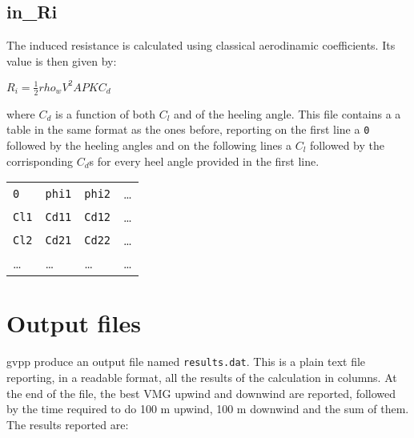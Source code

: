 \documentclass[a4paper,openany]{memoir}
\begin{document}
\section{in\_Ri}

The induced resistance is calculated using classical aerodinamic coefficients. Its value is then given by:

\begin{center} 
  $ R_i = \frac{1}{2} rho_w V^2 APK C_d $ 
\end{center}

where $C_d$ is a function of both $C_l$ and of the heeling angle.
This file contains a a table in the same format as the ones before, reporting on the first line a \texttt{0} followed by the heeling angles and on the following lines a $C_l$ followed by the corrisponding $C_d$s for every heel angle provided in the first line.

\begin{table}[h]
  \centering
  \begin{tabular}{l l l l}
    \texttt{0} 	& \texttt{phi1} & \texttt{phi2} & \dots \\
    \texttt{Cl1} 	& \texttt{Cd11} & \texttt{Cd12} & \dots \\
    \texttt{Cl2} 	& \texttt{Cd21} & \texttt{Cd22}	& \dots \\
    \dots 		& \dots 	& \dots 	& \dots \\
  \end{tabular}
\end{table}

\chapter{Output files}
\label{chapter_OutputFiles}
gvpp produce an output file named \texttt{results.dat}. This is a plain text file reporting, in a readable format, all the results of the calculation in columns. At the end of the file, the best VMG upwind and downwind are reported, followed by the time required to do 100 m upwind, 100 m downwind and the sum of them.
The results reported are:
\end{document}
